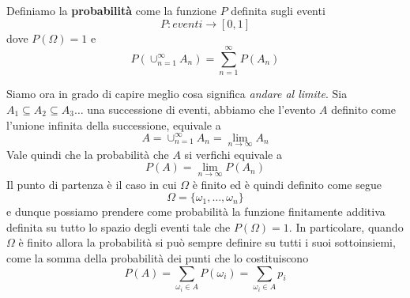 \begin{definition}
	Definiamo la \textbf{probabilità} come la funzione $P$ definita sugli eventi
	\[ P : eventi \to [0, 1] \]
	dove $P(\Omega) = 1$ e
	\[ P(\cup_{n=1}^\infty A_n) = \sum_{n=1}^\infty P(A_n) \]
\end{definition}

Siamo ora in grado di capire meglio cosa significa \emph{andare al limite}. Sia
$A_1 \subseteq A_2 \subseteq A_3 \dots$ una successione di eventi, abbiamo che l'evento $A$ definito come
l'unione infinita della successione, equivale a
\[ A = \cup_{n=1}^\infty A_n = \lim_{n \to \infty} A_n \]
Vale quindi che la probabilità che $A$ si verfichi equivale a
\[ P(A) = \lim_{n \to \infty} P(A_n) \]
Il punto di partenza è il caso in cui $\Omega$ è finito ed è quindi definito come segue
\[ \Omega = \{ \omega_1, \dots, \omega_n \} \]
e dunque possiamo prendere come probabilità la funzione finitamente additiva definita su tutto lo spazio
degli eventi tale che $P(\Omega) = 1$. In particolare, quando $\Omega$ è finito allora la probabilità si
può sempre definire su tutti i suoi sottoinsiemi, come la somma della probabilità dei punti che lo
costituiscono
\[ P(A) = \sum_{\omega_i \in A} P(\omega_i) = \sum_{\omega_i \in A} p_i \]